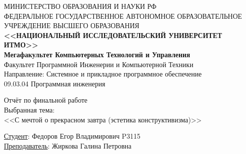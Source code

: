 \begin{titlepage}
    \thispagestyle{firststyle}
        \begin{center}
            МИНИСТЕРСТВО ОБРАЗОВАНИЯ И НАУКИ РФ \\
            \vspace{0.5cm}
            ФЕДЕРАЛЬНОЕ ГОСУДАРСТВЕННОЕ АВТОНОМНОЕ ОБРАЗОВАТЕЛЬНОЕ УЧРЕЖДЕНИЕ ВЫСШЕГО ОБРАЗОВАНИЯ\\
            \vspace{0.5cm}
            \textbf{<<НАЦИОНАЛЬНЫЙ ИССЛЕДОВАТЕЛЬСКИЙ УНИВЕРСИТЕТ ИТМО>>}\\
            \vspace{1cm}
            \textbf{Мегафакультет Компьютерных Технологий и Управления} \\
            \vspace{0.5cm}
            Факультет Программной Инженерии и Компьютерной Техники \\
            \vspace{0.5cm}
            Направление: Системное и прикладное программное обеспечение \\
            \vspace{0.5cm}
            09.03.04 Программная инженерия \\
        \end{center}

        \vspace{1cm}
        \begin{center}
            Отчёт по финальной работе \\
            Выбранная тема: \\
            <<С мечтой о прекрасном завтра (эстетика конструктивизма)>>
        \end{center}

        \vspace{4cm}

        \begin{flushleft}
            \hspace{7.1953125cm} \underline{Студент}: Федоров Егор Владимирович P3115 \\
            \hspace{7.1953125cm} \underline{Преподаватель}: Жиркова Галина Петровна \\
        \end{flushleft}
\end{titlepage}
